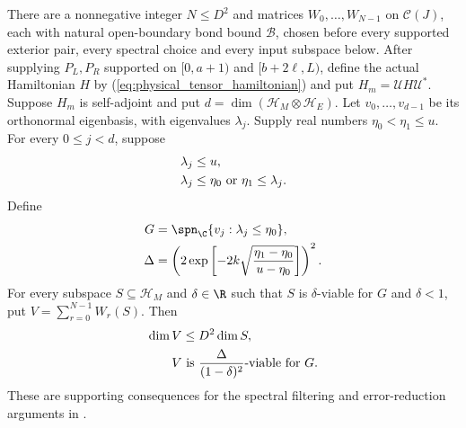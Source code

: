 \begin{lemma}
    \label{thm:physical_chebyshev_viability}
    \leanok
    There are a nonnegative integer $N\le D^2$ and matrices
    $W_0,\ldots,W_{N-1}$ on
    $\mathcal C(J)$, each with natural open-boundary bond bound
    $\mathcal B$, chosen before every supported exterior pair, every spectral
    choice and every input subspace below.
    After supplying $P_L,P_R$ supported on $\lbrack 0,a+1)$ and $\lbrack b+2\ell,L)$,
    define the actual Hamiltonian $H$ by
    (\ref{eq:physical_tensor_hamiltonian}) and put
    $H_m=\mathcal U H\mathcal U^*$.
    Suppose $H_m$ is self-adjoint and put
    $d=\dim(\mathcal H_M\otimes\mathcal H_E)$.
    Let $v_0,\ldots,v_{d-1}$ be its orthonormal eigenbasis, with eigenvalues
    $\lambda_j$.
    Supply real numbers $\eta_0<\eta_1\le u$. For every $0\le j<d$,
    suppose
    \begin{align}
        \lambda_j & \le u,\notag                              \\
        \lambda_j & \le\eta_0\ \text{or}\ \eta_1\le\lambda_j.
        \label{eq:physical_chebyshev_spectrum}
    \end{align}
    Define
    \begin{align}
        G      & =\spn_{\C}\{v_j:\lambda_j\le\eta_0\},
        \label{eq:physical_chebyshev_target}           \\
        \Delta & =\left(2\exp\left[-2k\sqrt{
            \frac{\eta_1-\eta_0}{u-\eta_0}}\right]\right)^2.
        \label{eq:physical_chebyshev_error}
    \end{align}
    For every subspace $S\subseteq\mathcal H_M$ and $\delta\in\R$ such
    that $S$ is $\delta$-viable for $G$ and $\delta<1$, put
    $V=\sum_{r=0}^{N-1}W_r(S)$. Then
    \begin{align}
        \dim V & \le D^2\dim S,\notag                                        \\
        V      & \text{ is }\frac{\Delta}{(1-\delta)^2}\text{-viable for }G.
        \label{eq:physical_chebyshev_conclusion}
    \end{align}
    These are supporting consequences for the spectral filtering and
    error-reduction arguments in \cite{Arad2016RigorousRG}.
\end{lemma}
